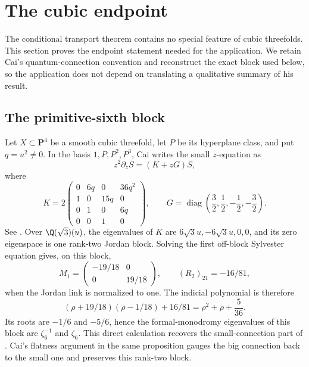 \section{The cubic endpoint}
\label{sec:cubic-endpoint}

The conditional transport theorem contains no special feature of cubic
threefolds.  This section proves the endpoint statement needed for the
application.  We retain
Cai's quantum-connection convention and reconstruct the exact block used
below, so the application does not depend on translating a qualitative
summary of his result.

\subsection{The primitive-sixth block}

Let \(X\subset\mathbf P^4\) be a smooth cubic threefold, let \(P\) be its
hyperplane class, and put \(q=u^2\ne0\).  In the basis
\(1,P,P^2,P^3\), Cai writes the small \(z\)-equation as
\begin{equation}\label{eq:cubic-small-z-equation}
 z^2\partial_zS=(K+zG)S,
\end{equation}
where
\begin{equation}\label{eq:cai-cubic-matrices}
 K=2\begin{pmatrix}
 0&6q&0&36q^2\\
 1&0&15q&0\\
 0&1&0&6q\\
 0&0&1&0
 \end{pmatrix},
 \qquad
 G=\operatorname{diag}\!\left(\frac32,\frac12,-\frac12,-\frac32\right).
\end{equation}
See \cite[Section~3]{Cai}.  Over \(\Q(\sqrt3)(u)\), the eigenvalues of \(K\)
are \(6\sqrt3u,-6\sqrt3u,0,0\), and its zero eigenspace is one rank-two
Jordan block.  Solving the first off-block Sylvester equation gives, on this
block,
\begin{equation}\label{eq:cubic-zero-block-data}
 M_1=\begin{pmatrix}-19/18&0\\0&19/18\end{pmatrix},
 \qquad (R_2)_{21}=-16/81,
\end{equation}
when the Jordan link is normalized to one.  The indicial polynomial is
therefore
\begin{equation}\label{eq:cubic-indicial-polynomial}
 (\rho+19/18)(\rho-1/18)+16/81
   =\rho^2+\rho+\frac5{36}.
\end{equation}
Its roots are \(-1/6\) and \(-5/6\), hence the formal-monodromy eigenvalues
of this block are \(\zeta_6^{-1}\) and \(\zeta_6\).  This direct calculation
recovers the small-connection part of \cite[Proposition~6]{Cai}.  Cai's
flatness argument in the same proposition gauges the big connection back to
the small one and preserves this rank-two block.

